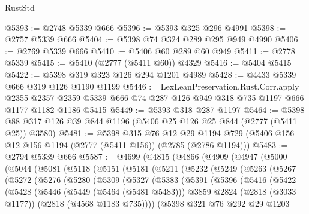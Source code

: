 \begin{lexlean}{RustStd}
\begin{coremodule}
@5393 := @2748 @5339 @666
@5396 := @5393 @325 @296 @4991
@5398 := @2757 @5339 @666
@5404 := @5398 @74 @324 @289 @295 @949 @4990
@5406 := @2769 @5339 @666
@5410 := @5406 @60 @289 @60 @949
@5411 := @2778 @5339
@5415 := @5410 (@2777 (@5411 @60)) @4329
@5416 := @5404 @5415
@5422 := @5398 @319 @323 @126 @294 @1201 @4989
@5428 := @4433 @5339 @666 @319 @126 @1190 @1199
@5446 := LexLeanPreservation.Rust.Corr.apply
    @2355
    @2357
    @2359
    @5339
    @666
    @74
    @287
    @126
    @949
    @318
    @735
    @1197
    @666
    @1177
    @1182
    @1186
    @5415
@5449 := @5393 @318 @287 @1197
@5464 := @5398 @88 @317 @126 @39 @844 @1196 (@5406 @25 @126 @25 @844 (@2777 (@5411 @25)) @3580)
@5481 := @5398
    @315
    @76
    @12
    @29
    @1194
    @729
    (@5406 @156 @12 @156 @1194 (@2777 (@5411 @156)) (@2785 (@2786 @1194)))
@5483 := @2794 @5339 @666
@5587 := @4699
    (@4815
      (@4866
        (@4909
          (@4947
            (@5000
              (@5044
                (@5081
                  (@5118
                    (@5151
                      (@5181
                        (@5211
                          (@5232
                            (@5249
                              (@5263
                                (@5267
                                  (@5272
                                    (@5276
                                      (@5280
                                        (@5309
                                          (@5327
                                            (@5383
                                              (@5391
                                                (@5396
                                                  (@5416
                                                    (@5422
                                                      (@5428
                                                        (@5446
                                                          (@5449 (@5464 (@5481 @5483)))
                                                          @3859
                                                          @2824
                                                          (@2818 (@3033 @1177))
                                                          (@2818 (@4568 @1183 @735))))
                                                      (@5398
                                                        @321
                                                        @76
                                                        @292
                                                        @29
                                                        @1203

\end{coremodule}
\end{lexlean}
